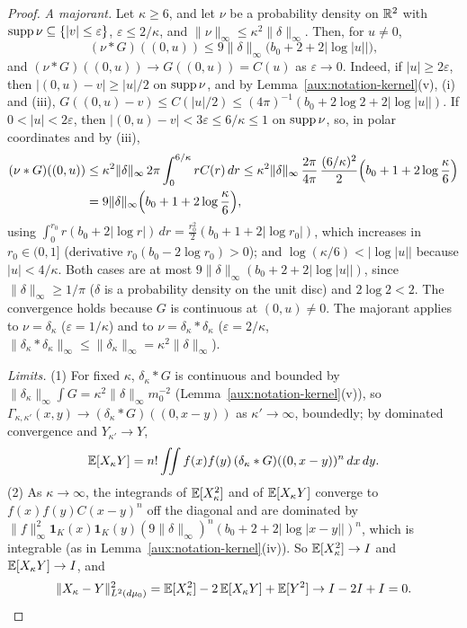 \begin{proof}
\emph{A majorant.}  Let $\kappa\ge6$, and let $\nu$ be a probability density on $\mathbb{R}^2$ with
$\operatorname{supp}\nu\subseteq\{|v|\le\varepsilon\}$, $\varepsilon\le2/\kappa$, and
$\|\nu\|_\infty\le\kappa^2\|\delta\|_\infty$.  Then, for $u\ne0$,
\[
 (\nu*G)((0,u))\le9\|\delta\|_\infty\bigl(b_0+2+2|\log|u||\bigr),
\]
and $(\nu*G)((0,u))\to G((0,u))=C(u)$ as $\varepsilon\to0$.  Indeed, if $|u|\ge2\varepsilon$, then
$|(0,u)-v|\ge|u|/2$ on $\operatorname{supp}\nu$, and by Lemma~\ref{aux:notation-kernel}(v), (i) and (iii),
$G((0,u)-v)\le C(|u|/2)\le(4\pi)^{-1}(b_0+2\log2+2|\log|u||)$.  If $0<|u|<2\varepsilon$, then
$|(0,u)-v|<3\varepsilon\le6/\kappa\le1$ on $\operatorname{supp}\nu$, so, in polar coordinates and by (iii),
\begin{align*}
 (\nu*G)((0,u))&\le\kappa^2\|\delta\|_\infty\,2\pi\int_0^{6/\kappa}rC(r)\,dr
 \le\kappa^2\|\delta\|_\infty\,\frac{2\pi}{4\pi}\,\frac{(6/\kappa)^2}{2}
 \Bigl(b_0+1+2\log\frac\kappa6\Bigr)\\
 &=9\|\delta\|_\infty\Bigl(b_0+1+2\log\frac\kappa6\Bigr),
\end{align*}
using $\int_0^{r_0}r(b_0+2|\log r|)\,dr=\frac{r_0^2}2(b_0+1+2|\log r_0|)$, which increases in
$r_0\in(0,1]$ (derivative $r_0(b_0-2\log r_0)>0$); and $\log(\kappa/6)<|\log|u||$ because
$|u|<4/\kappa$.  Both cases are at most $9\|\delta\|_\infty(b_0+2+2|\log|u||)$, since
$\|\delta\|_\infty\ge1/\pi$ ($\delta$ is a probability density on the unit disc) and $2\log2<2$.
The convergence holds because $G$ is continuous at $(0,u)\ne0$.  The majorant applies to
$\nu=\delta_\kappa$ ($\varepsilon=1/\kappa$) and to $\nu=\delta_\kappa*\delta_\kappa$
($\varepsilon=2/\kappa$, $\|\delta_\kappa*\delta_\kappa\|_\infty\le\|\delta_\kappa\|_\infty=
\kappa^2\|\delta\|_\infty$).

\emph{Limits.}  (1) For fixed $\kappa$, $\delta_\kappa*G$ is continuous and bounded by
$\|\delta_\kappa\|_\infty\int G=\kappa^2\|\delta\|_\infty m_0^{-2}$
(Lemma~\ref{aux:notation-kernel}(v)), so $\Gamma_{\kappa,\kappa'}(x,y)\to(\delta_\kappa*G)((0,x-y))$
as $\kappa'\to\infty$, boundedly; by dominated convergence and $Y_{\kappa'}\to Y$,
\[
 \mathbb{E}[X_\kappa Y]=n!\iint f(x)f(y)\,(\delta_\kappa*G)((0,x-y))^n\,dx\,dy .
\]
(2) As $\kappa\to\infty$, the integrands of $\mathbb{E}[X_\kappa^2]$ and of $\mathbb{E}[X_\kappa Y]$ converge to
$f(x)f(y)C(x-y)^n$ off the diagonal and are dominated by
$\|f\|_\infty^2\mathbf 1_K(x)\mathbf 1_K(y)(9\|\delta\|_\infty)^n(b_0+2+2|\log|x-y||)^n$, which is
integrable (as in Lemma~\ref{aux:notation-kernel}(iv)).  So $\mathbb{E}[X_\kappa^2]\to I$ and
$\mathbb{E}[X_\kappa Y]\to I$, and
\[
 \|X_\kappa-Y\|_{L^2(d\mu_0)}^2=\mathbb{E}[X_\kappa^2]-2\,\mathbb{E}[X_\kappa Y]+\mathbb{E}[Y^2]\to I-2I+I=0 .\qedhere
\]
\end{proof}

